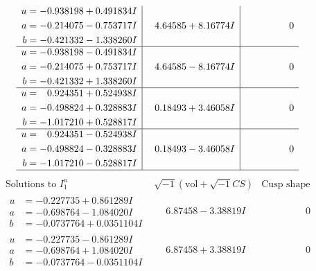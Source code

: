 \documentclass[1p]{elsarticle_modified}
\theoremstyle{definition}
\newcommand{\I}{\sqrt{-1}}
\begin{document}
$$\begin{array}{c|c|c}
\begin{aligned}
u &= -0.938198 + 0.491834 I \\
a &= -0.214075 - 0.753717 I \\
b &= -0.421332 - 1.338260 I\end{aligned}
 & \phantom{-}4.64585 + 8.16774 I & \phantom{-0.000000 } 0 \\ \hline\begin{aligned}
u &= -0.938198 - 0.491834 I \\
a &= -0.214075 + 0.753717 I \\
b &= -0.421332 + 1.338260 I\end{aligned}
 & \phantom{-}4.64585 - 8.16774 I & \phantom{-0.000000 } 0 \\ \hline\begin{aligned}
u &= \phantom{-}0.924351 + 0.524938 I \\
a &= -0.498824 + 0.328883 I \\
b &= -1.017210 + 0.528817 I\end{aligned}
 & \phantom{-}0.18493 + 3.46058 I & \phantom{-0.000000 } 0 \\ \hline\begin{aligned}
u &= \phantom{-}0.924351 - 0.524938 I \\
a &= -0.498824 - 0.328883 I \\
b &= -1.017210 - 0.528817 I\end{aligned}
 & \phantom{-}0.18493 - 3.46058 I & \phantom{-0.000000 } 0\\
 \hline 
 \end{array}$$\newpage$$\begin{array}{c|c|c}  
\text{Solutions to }I^u_{1}& \I (\text{vol} + \sqrt{-1}CS) & \text{Cusp shape}\\
 \hline 
\begin{aligned}
u &= -0.227735 + 0.861289 I \\
a &= -0.698764 - 1.084020 I \\
b &= -0.0737764 + 0.0351104 I\end{aligned}
 & \phantom{-}6.87458 - 3.38819 I & \phantom{-0.000000 } 0 \\ \hline\begin{aligned}
u &= -0.227735 - 0.861289 I \\
a &= -0.698764 + 1.084020 I \\
b &= -0.0737764 - 0.0351104 I\end{aligned}
 & \phantom{-}6.87458 + 3.38819 I & \phantom{-0.000000 } 0 \\ \hline\begin{aligned}

\end{aligned}
\end{array}$$
\end{document}
